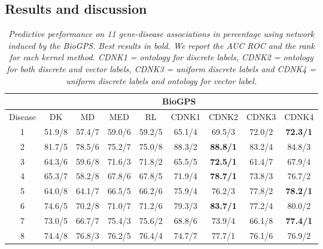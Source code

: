 \documentclass[review]{elsarticle}
\begin{document}
\subsection{Results and discussion}
\begin{table}[h]
\caption{\textit {Predictive performance on 11 gene-disease associations in percentage using network induced by the BioGPS. Best results in bold. We report the AUC ROC and the rank for each kernel method.  CDNK1 = ontology for discrete labels, CDNK2 = ontology for both discrete and vector labels, CDNK3 = uniform discrete labels and CDNK4 = uniform discrete labels and ontology for vector label.}} \vspace{1em}
\centering
\setlength{\tabcolsep}{1mm}
\begin{tabular}{|c|c|c|c|c|c|c|c|c|}
\hline
         & \multicolumn{8}{c|}{\textbf{BioGPS}}\\
 \hline
Disease & DK & MD & MED & RL & CDNK1 & CDNK2 & CDNK3 & CDNK4\\

 \hline
1 & 51.9/8 & 57.4/7 & 59.0/6 & 59.2/5 & 65.1/4 & 69.5/3 & 72.0/2 & \textbf{72.3/1} \\

2 & 81.7/5 & 78.5/6 & 75.2/7 & 75.0/8 & 88.3/2 & \textbf{88.8/1} & 83.2/4 & 84.8/3 \\

3 & 64.3/6 & 59.6/8 & 71.6/3 & 71.8/2 & 65.5/5 & \textbf{72.5/1} & 61.4/7 & 67.9/4 \\

4 & 65.3/7 & 58.2/8 & 67.8/6 & 67.8/5 & 71.9/4 & \textbf{78.7/1} & 73.8/3 & 76.7/2 \\

5 & 64.0/8 & 64.1/7 & 66.5/5 & 66.2/6 & 75.9/4 & 76.2/3 & 77.8/2 & \textbf{78.2/1} \\

6 & 74.6/5 & 70.2/8 & 71.0/7 & 71.2/6 & 79.3/3 & \textbf{83.7/1} & 77.2/4 & 80.0/2 \\

7 & 73.0/5 & 66.7/7 & 75.4/3 & 75.6/2 & 68.8/6 & 73.9/4 & 66.1/8 & \textbf{77.4/1} \\

8 & 74.4/8 & 76.8/3 & 76.2/5 & 76.4/4 & 74.7/7 & 77.7/1 & 76.1/6 & 76.9/2 \\


\end{tabular}
\end{table}
\end{document}
